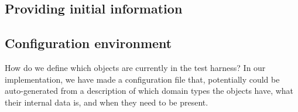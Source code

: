 \subsection{Providing initial information}

\subsection{Configuration environment}
How do we define which objects are currently in the test harness? In our implementation, we have made a configuration file that, potentially could be auto-generated from a description of which domain types the objects have, what their internal data is, and when they need to be present.
